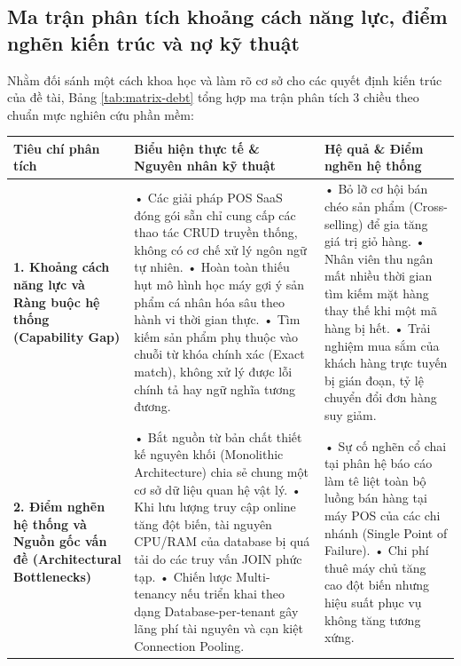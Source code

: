 \documentclass[12pt,a4paper]{report}
\begin{document}
\subsection{Ma trận phân tích khoảng cách năng lực, điểm nghẽn kiến trúc và nợ kỹ thuật}

Nhằm đối sánh một cách khoa học và làm rõ cơ sở cho các quyết định kiến trúc của đề tài, Bảng \ref{tab:matrix-debt} tổng hợp ma trận phân tích 3 chiều theo chuẩn mực nghiên cứu phần mềm:

\begin{table}[htbp]
\centering
\renewcommand{\arraystretch}{1.4}
\small
\begin{tabularx}{\textwidth}{|p{3.5cm}|X|X|}
\hline
\rowcolor[HTML]{EFEFEF}
\textbf{Tiêu chí phân tích} & \textbf{Biểu hiện thực tế \& Nguyên nhân kỹ thuật} & \textbf{Hệ quả \& Điểm nghẽn hệ thống} \\ \hline
\textbf{1. Khoảng cách năng lực và Ràng buộc hệ thống (Capability Gap)} & 
• Các giải pháp POS SaaS đóng gói sẵn chỉ cung cấp các thao tác CRUD truyền thống, không có cơ chế xử lý ngôn ngữ tự nhiên.\newline
• Hoàn toàn thiếu hụt mô hình học máy gợi ý sản phẩm cá nhân hóa sâu theo hành vi thời gian thực.\newline
• Tìm kiếm sản phẩm phụ thuộc vào chuỗi từ khóa chính xác (Exact match), không xử lý được lỗi chính tả hay ngữ nghĩa tương đương. & 
• Bỏ lỡ cơ hội bán chéo sản phẩm (Cross-selling) để gia tăng giá trị giỏ hàng.\newline
• Nhân viên thu ngân mất nhiều thời gian tìm kiếm mặt hàng thay thế khi một mã hàng bị hết.\newline
• Trải nghiệm mua sắm của khách hàng trực tuyến bị gián đoạn, tỷ lệ chuyển đổi đơn hàng suy giảm. \\ \hline

\textbf{2. Điểm nghẽn hệ thống và Nguồn gốc vấn đề (Architectural Bottlenecks)} & 
• Bắt nguồn từ bản chất thiết kế nguyên khối (Monolithic Architecture) chia sẻ chung một cơ sở dữ liệu quan hệ vật lý.\newline
• Khi lưu lượng truy cập online tăng đột biến, tài nguyên CPU/RAM của database bị quá tải do các truy vấn JOIN phức tạp.\newline
• Chiến lược Multi-tenancy nếu triển khai theo dạng Database-per-tenant gây lãng phí tài nguyên và cạn kiệt Connection Pooling. & 
• Sự cố nghẽn cổ chai tại phân hệ báo cáo làm tê liệt toàn bộ luồng bán hàng tại máy POS của các chi nhánh (Single Point of Failure).\newline
• Chi phí thuê máy chủ tăng cao đột biến nhưng hiệu suất phục vụ không tăng tương xứng. \\ \hline


\end{tabularx}
\end{table}
\end{document}

